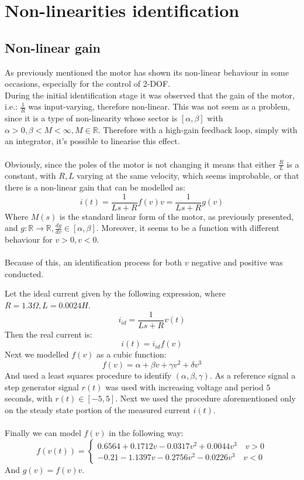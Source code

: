 \chapter{Non-linearities identification}

\section{Non-linear gain}
As previously mentioned the motor has shown its non-linear behaviour in some occasions, especially for the control of 2-DOF. \\
During the initial identification stage it was observed that the gain of the motor, i.e.: $\frac{1}{R}$ was input-varying, therefore non-linear. This was not seem as a problem, since it is a type of non-linearity whose sector is $[\alpha, \beta]$ with $\alpha > 0, \beta <M < \infty, M \in \mathbb{R}$. Therefore with a high-gain feedback loop, simply with an integrator, it's possible to linearise this effect. \\ \\
Obviously, since the poles of the motor is not changing  it means that either $\frac{R}{L}$ is a constant, with $R,L$ varying at the same velocity, which seems improbable, or that there is a non-linear gain that can be modelled as:
\begin{equation}
i(t)=\frac{1}{Ls+R} f(v)v = \frac{1}{Ls+R} g(v)
\end{equation}
Where $M(s)$ is the standard linear form of the motor, as previously presented, and $g: \mathbb{R} \to \mathbb{R}, \frac{dg}{dv} \in [\alpha, \beta]$.
Moreover, it seems to be a function with different behaviour for $v>0, v<0$. \\ \\Because of this, an identification process for both $v$ negative and positive was conducted.

Let the ideal current given by the following expression, where $R=1.3 \Omega, L=0.0024 H$.
\begin{equation}
i_{id}=\frac{1}{Ls+R} v(t)
\end{equation}
Then the real current is:
\begin{equation}
i(t)=  i_{id} f(v)
\end{equation}
Next we modelled $f(v)$ as a cubic function:
\begin{equation}
f(v) = \alpha+\beta v + \gamma v^2+\delta v^3
\end{equation}
And used a least squares procedure to identify $(\alpha, \beta, \gamma)$.
As a reference signal a step generator signal $r(t)$ was used with increasing voltage and period $5$ seconds, with $r(t) \in [-5,5]$. Next we used the procedure aforementioned only on the steady state portion  of the  measured current $i(t)$.\\ \\
Finally we can model $f(v)$ in the following way:
\begin{equation}
f(v(t)) = \begin{cases}
0.6564+0.1712v-0.0317v^2+0.0044v^3 \quad v>0 \\
-0.21-1.1397v-0.2756v^2-0.0226v^3 \quad v< 0
\end{cases}
\end{equation}
And $g(v) =f(v)v$.

